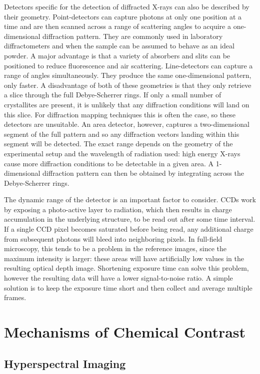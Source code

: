 \documentclass[journal=cmatex,manuscript=perspective]{achemso}
\begin{document}
Detectors specific for the detection of diffracted X-rays can also be
described by their geometry. Point-detectors can capture photons at
only one position at a time and are then scanned across a range of
scattering angles to acquire a one-dimensional diffraction
pattern. They are commonly used in laboratory diffractometers and when
the sample can be assumed to behave as an ideal powder. A major
advantage is that a variety of absorbers and slits can be positioned
to reduce fluorescence and air scattering. Line-detectors can capture
a range of angles simultaneously. They produce the same
one-dimensional pattern, only faster. A disadvantage of both of these
geometries is that they only retrieve a slice through the full
Debye-Scherrer rings. If only a small number of crystallites are
present, it is unlikely that any diffraction conditions will land on
this slice. For diffraction mapping techniques this is often the case,
so these detectors are unsuitable. An area detector, however, captures
a two-dimensional segment of the full pattern and so any diffraction
vectors landing within this segment will be detected. The exact range
depends on the geometry of the experimental setup and the wavelength
of radiation used: high energy X-rays cause more diffraction
conditions to be detectable in a given area. A 1-dimensional
diffraction pattern can then be obtained by integrating across the
Debye-Scherrer rings.

The dynamic range of the detector is an important factor to
consider. CCDs work by exposing a photo-active layer to radiation,
which then results in charge accumulation in the underlying structure,
to be read out after some time interval. If a single CCD pixel becomes
saturated before being read, any additional charge from subsequent
photons will bleed into neighboring pixels. In full-field microscopy,
this tends to be a problem in the reference images, since the maximum
intensity is larger: these areas will have artificially low values in
the resulting optical depth image. Shortening exposure time can solve
this problem, however the resulting data will have a lower
signal-to-noise ratio. A simple solution is to keep the exposure time
short and then collect and average multiple frames.

\section{Mechanisms of Chemical Contrast}

\subsection{Hyperspectral Imaging}
\end{document}

